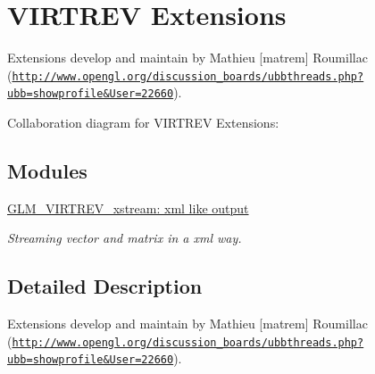 \hypertarget{group__virtrev}{}\section{V\+I\+R\+T\+R\+E\+V Extensions}
\label{group__virtrev}


Extensions develop and maintain by Mathieu \mbox{[}matrem\mbox{]} Roumillac (\href{http://www.opengl.org/discussion_boards/ubbthreads.php?ubb=showprofile&User=22660}{\tt http\+://www.\+opengl.\+org/discussion\+\_\+boards/ubbthreads.\+php?ubb=showprofile\&\+User=22660}).  


Collaboration diagram for V\+I\+R\+T\+R\+E\+V Extensions\+:
\subsection*{Modules}
\begin{DoxyCompactItemize}
\item 
\hyperlink{group__virtrev__xstream}{G\+L\+M\+\_\+\+V\+I\+R\+T\+R\+E\+V\+\_\+xstream\+: xml like output}
\begin{DoxyCompactList}\small\item\em Streaming vector and matrix in a xml way. \end{DoxyCompactList}\end{DoxyCompactItemize}


\subsection{Detailed Description}
Extensions develop and maintain by Mathieu \mbox{[}matrem\mbox{]} Roumillac (\href{http://www.opengl.org/discussion_boards/ubbthreads.php?ubb=showprofile&User=22660}{\tt http\+://www.\+opengl.\+org/discussion\+\_\+boards/ubbthreads.\+php?ubb=showprofile\&\+User=22660}). 


